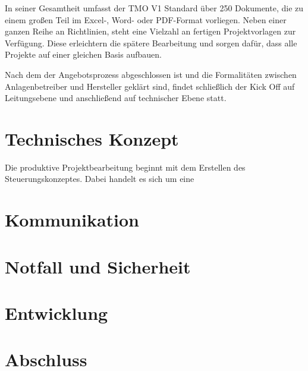 In seiner Gesamtheit umfasst der TMO V1 Standard über 250 Dokumente, die zu einem großen Teil im Excel-, Word- oder PDF-Format vorliegen. Neben einer ganzen Reihe an Richtlinien, steht eine Vielzahl an fertigen Projektvorlagen zur Verfügung. Diese erleichtern die spätere Bearbeitung und sorgen dafür, dass alle Projekte auf einer gleichen Basis aufbauen.

Nach dem der Angebotsprozess abgeschlossen ist und die Formalitäten zwischen Anlagenbetreiber und Hersteller geklärt sind, findet schließlich der Kick Off auf Leitungsebene und anschließend auf technischer Ebene statt.
\section{Technisches Konzept}
Die produktive Projektbearbeitung beginnt mit dem Erstellen des Steuerungskonzeptes. Dabei handelt es sich um eine
\section{Kommunikation}
\section{Notfall und Sicherheit}
\section{Entwicklung}
\section{Abschluss}
